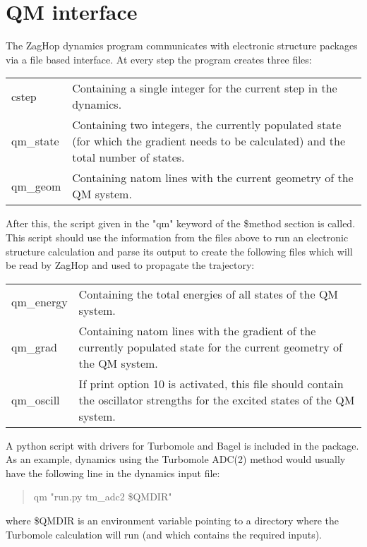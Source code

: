 \documentclass{report}
\begin{document}
\section*{QM interface} \label{sec:interface}
The ZagHop dynamics program communicates with electronic structure packages via a file based interface. At every step the program creates three files:
\begin{tabularx}{\textwidth}{ m{2.5cm} X }
cstep		& Containing a single integer for the current step in the dynamics. \\
qm\_state	& Containing two integers, the currently populated state (for which the gradient needs to be calculated) and the total number of states. \\
qm\_geom	& Containing natom lines with the current geometry of the QM system.
\end{tabularx}
After this, the script given in the "qm" keyword of the \$method section is called. This script should use the information from the files above to run an electronic structure calculation and parse its output to create the following files which will be read by ZagHop and used to propagate the trajectory:
\begin{tabularx}{\textwidth}{ m{2.5cm} X }
	qm\_energy	& Containing the total energies of all states of the QM system. \\
	qm\_grad	& Containing natom lines with the gradient of the currently populated state for the current geometry of the QM system. \\
	qm\_oscill	& If print option 10 is activated, this file should contain the oscillator strengths for the excited states of the QM system.
\end{tabularx}

A python script with drivers for Turbomole and Bagel is included in the package. As an example, dynamics using the Turbomole ADC(2) method would usually have the following line in the dynamics input file:
\begin{quote}
	qm "run.py tm\_adc2 \$QMDIR"
\end{quote}
where \$QMDIR is an environment variable pointing to a directory where the Turbomole calculation will run (and which contains the required inputs).
\end{document}

